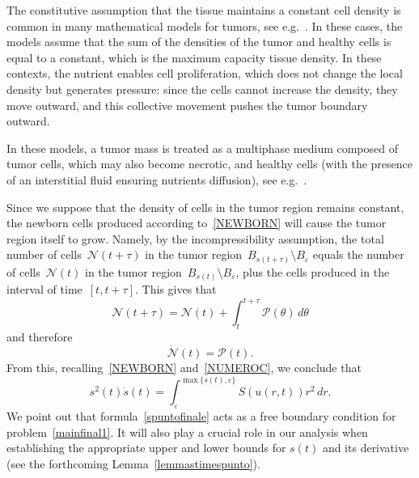 \documentclass[12pt,a4paper,intlimits,sumlimits]{amsart}
\theoremstyle{definition}
\theoremstyle{plain}
\numberwithin{equation}{section}
\begin{document}
The constitutive assumption that the tissue maintains a constant cell density is common in many mathematical models for tumors, see e.g.~\cite{WARD}. In these cases, the models assume that the sum of the densities of the tumor and healthy cells is equal to a constant, which is the maximum capacity tissue density. In these contexts, the 
nutrient enables cell proliferation, which does not change the local density but generates pressure: since the cells cannot increase the density, they move outward, and this collective movement pushes the tumor boundary outward.

In these models, a tumor mass is treated as a multiphase medium composed of tumor cells, which may also become necrotic, and healthy cells (with the presence of an interstitial fluid ensuring nutrients diffusion), see e.g.~\cite{SCIU}.

Since we suppose that the density of cells in the tumor region remains constant, the newborn cells produced according to~\eqref{NEWBORN} will cause the tumor region itself to grow.
Namely, by the incompressibility assumption, the total number of cells~${\mathcal{N}}(t+\tau)$
in the tumor region~$B_{s(t+\tau)}\setminus B_\varepsilon$ equals the 
number of cells~${\mathcal{N}}(t)$
in the tumor region~$B_{s(t)}\setminus B_\varepsilon$, plus the cells produced
in the interval of time~$[t,t+\tau]$. This gives that
$$ {\mathcal{N}}(t+\tau)={\mathcal{N}}(t)+\int_t^{t+\tau}{\mathcal{P}}(\theta)\,d\theta$$
and therefore
$$ \dot{\mathcal{N}}(t)={\mathcal{P}}(t).$$
{F}rom this, recalling~\eqref{NEWBORN} and~\eqref{NUMEROC}, we conclude that 
\begin{equation}\label{spuntofinale}
s^2(t)\dot s(t)=\int_\varepsilon^{\max\{s(t),\varepsilon\}}S(u(r,t))r^2\,dr.
\end{equation}
We point out that formula~\eqref{spuntofinale} acts as a free boundary condition for problem~\eqref{mainfinal1}.
It will also play a crucial role in our analysis when establishing the appropriate upper and lower bounds for $s(t)$ and its derivative (see the forthcoming Lemma~\ref{lemmastimespunto}).
\end{document}
